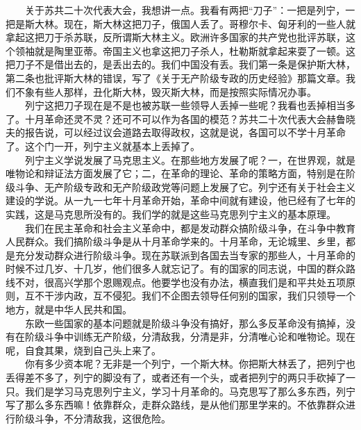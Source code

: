 \documentclass[cn,11pt,chinese]{elegantbook}
\begin{document}
　　关于苏共二十次代表大会，我想讲一点。我看有两把“刀子”：一把是列宁，一把是斯大林。现在，斯大林这把刀子，俄国人丢了。哥穆尔卡、匈牙利的一些人就拿起这把刀于杀苏联，反所谓斯大林主义。欧洲许多国家的共产党也批评苏联，这个领袖就是陶里亚蒂。帝国主义也拿这把刀子杀人，杜勒斯就拿起来耍了一顿。这把刀子不是借出去的，是丢出去的。我们中国没有丢。我们第一条是保护斯大林，第二条也批评斯大林的错误，写了《关于无产阶级专政的历史经验》那篇文章。我们不象有些人那样，丑化斯大林，毁灭斯大林，而是按照实际情况办事。\\
　　列宁这把刀子现在是不是也被苏联一些领导人丢掉一些呢？我看也丢掉相当多了。十月革命还灵不灵？还可不可以作为各国的模范？苏共二十次代表大会赫鲁晓夫的报告说，可以经过议会道路去取得政权，这就是说，各国可以不学十月革命了。这个门一开，列宁主义就基本上丢掉了。\\
　　列宁主义学说发展了马克思主义。在那些地方发展了呢？一，在世界观，就是唯物论和辩证法方面发展了它；二，在革命的理论、革命的策略方面，特别是在阶级斗争、无产阶级专政和无产阶级政党等问题上发展了它。列宁还有关于社会主义建设的学说。从一九一七年十月革命开始，革命中间就有建设，他已经有了七年的实践，这是马克思所没有的。我们学的就是这些马克思列宁主义的基本原理。\\
　　我们在民主革命和社会主义革命中，都是发动群众搞阶级斗争，在斗争中教育人民群众。我们搞阶级斗争是从十月革命学来的。十月革命，无论城里、乡里，都是充分发动群众进行阶级斗争。现在苏联派到各国去当专家的那些人，十月革命的时候不过几岁、十几岁，他们很多人就忘记了。有的国家的同志说，中国的群众路线不对，很高兴学那个恩赐观点。他要学也没有办法，横直我们是和平共处五项原则，互不干涉内政，互不侵犯。我们不企图去领导任何别的国家，我们只领导一个地方，就是中华人民共和国。\\
　　东欧一些国家的基本问题就是阶级斗争没有搞好，那么多反革命没有搞掉，没有在阶级斗争中训练无产阶级，分清敌我，分清是非，分清唯心论和唯物论。现在呢，自食其果，烧到自己头上来了。\\
　　你有多少资本呢？无非是一个列宁，一个斯大林。你把斯大林丢了，把列宁也丢得差不多了，列宁的脚没有了，或者还有一个头，或者把列宁的两只手砍掉了一只。我们是学习马克思列宁主义，学习十月革命的。马克思写了那么多东西，列宁写了那么多东西嘛！依靠群众，走群众路线，是从他们那里学来的。不依靠群众进行阶级斗争，不分清敌我，这很危险。\\
\end{document}
